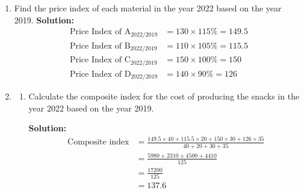 \documentclass{report}
\newcommand{\sol}{\textbf{Solution:}}
\begin{document}
\begin{enumerate}[leftmargin=*]
\begin{enumerate}
                    \sol{}
                    \begin{align*}
                        \text{Price index} & = \frac{P_{2020}}{P_{2019}} \times 100 \\
                        130                & = \frac{110}{P_{2019}} \times 100      \\
                        P_{2019}           & = \frac{110}{130} \times 100           \\
                                           & = \text{RM }84.62
                    \end{align*}

              \item  Find the price index of each material in the year 2022 based on the year 2019.
                    \sol{}
                    \begin{align*}
                        \text{Price Index of A}_{2022/2019} & = 130 \times 115\% = 149.5 \\
                        \text{Price Index of B}_{2022/2019} & = 110 \times 105\% = 115.5 \\
                        \text{Price Index of C}_{2022/2019} & = 150 \times 100\% = 150   \\
                        \text{Price Index of D}_{2022/2019} & = 140 \times 90\% = 126
                    \end{align*}

                    \newpage
              \item \begin{enumerate}
                        \item Calculate the composite index for the cost of producing the snacks in the year
                              2022 based on the year 2019.

                              \sol{}
                              \begin{align*}
                                  \text{Composite index} & = \frac{149.5 \times 40 + 115.5 \times 20 + 150 \times 30 + 126 \times 35}{40+20+30+35} \\
                                                         & = \frac{5980 + 2310 + 4500 + 4410}{125}                                                 \\
                                                         & = \frac{17200}{125}                                                                     \\
                                                         & = 137.6
                              \end{align*}


\end{enumerate}
\end{enumerate}
\end{enumerate}
\end{document}
